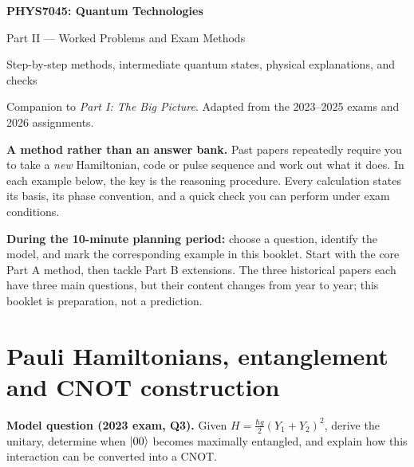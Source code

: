 \begin{center}
{\huge\bfseries PHYS7045: Quantum Technologies}\par
\vspace{2mm}
{\Large\color{accent}Part II --- Worked Problems and Exam Methods}\par
\vspace{2mm}
{\small Step-by-step methods, intermediate quantum states, physical explanations, and checks}\par
\vspace{2mm}
{\small Companion to \emph{Part I: The Big Picture}. Adapted from the 2023--2025 exams and 2026 assignments.}\par
\end{center}
\vspace{-2mm}
\begin{bigidea}
\textbf{A method rather than an answer bank.} Past papers repeatedly require you to take a \emph{new} Hamiltonian, code or pulse sequence and work out what it does. In each example below, the key is the reasoning procedure. Every calculation states its basis, its phase convention, and a quick check you can perform under exam conditions.
\end{bigidea}
\tableofcontents
\vspace{1mm}
\begin{examtip}
\textbf{During the 10-minute planning period:} choose a question, identify the model, and mark the corresponding example in this booklet. Start with the core Part A method, then tackle Part B extensions. The three historical papers each have three main questions, but their content changes from year to year; this booklet is preparation, not a prediction.
\end{examtip}

\section{Pauli Hamiltonians, entanglement and CNOT construction}\label{sec:yy}
\textbf{Model question (2023 exam, Q3).} Given $H=\frac{\hbar g}{2}(Y_1+Y_2)^2$, derive the unitary, determine when $\left\lvert 00\right\rangle$ becomes maximally entangled, and explain how this interaction can be converted into a CNOT.

